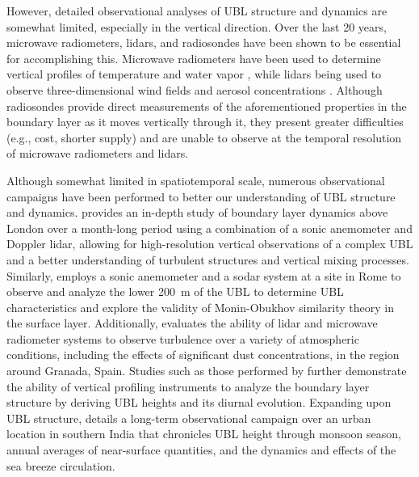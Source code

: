 \documentclass[11pt,a4paper]{article}
\begin{document}
However, detailed observational analyses of UBL structure and dynamics are somewhat limited, especially in the vertical direction. Over the last 20 years, microwave radiometers, lidars, and radiosondes have been shown to be essential for accomplishing this. Microwave radiometers have been used to determine vertical profiles of temperature and water vapor \citep{rose2005, wang2012}, while lidars being used to observe three-dimensional wind fields and aerosol concentrations \citep{grund2001}. Although radiosondes provide direct measurements of the aforementioned properties in the boundary layer as it moves vertically through it, they present greater difficulties (e.g., cost, shorter supply) and are unable to observe at the temporal resolution of microwave radiometers and lidars. 

Although somewhat limited in spatiotemporal scale, numerous observational campaigns have been performed to better our understanding of UBL structure and dynamics. \citet{barlow2011} provides an in-depth study of boundary layer dynamics above London over a month-long period using a combination of a sonic anemometer and Doppler lidar, allowing for high-resolution vertical observations of a complex UBL and a better understanding of turbulent structures and vertical mixing processes. Similarly, \citet{pelliccioni2012} employs a sonic anemometer and a sodar system at a site in Rome to observe and analyze the lower \SI{200}{\meter} of the UBL to determine UBL characteristics and explore the validity of Monin-Obukhov similarity theory in the surface layer. Additionally, \citet{dearrudamoreira2020} evaluates the ability of lidar and microwave radiometer systems to observe turbulence over a variety of atmospheric conditions, including the effects of significant dust concentrations, in the region around Granada, Spain. Studies such as those performed by \citet{banks2015, quan2013, wang2012} further demonstrate the ability of vertical profiling instruments to analyze the boundary layer structure by deriving UBL heights and its diurnal evolution. Expanding upon UBL structure, \citet{anurose2018} details a long-term observational campaign over an urban location in southern India that chronicles UBL height through monsoon season, annual averages of near-surface quantities, and the dynamics and effects of the sea breeze circulation. 
\end{document}
